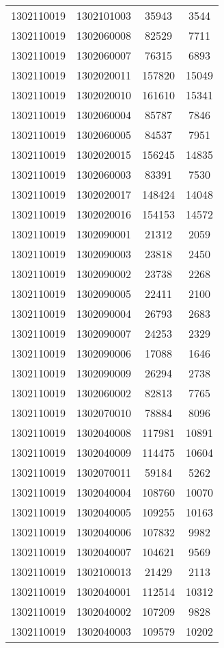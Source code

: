 \begin{longtable}[h]{llcc}
		1302110019 & 1302101003 & 35943 & 3544\\
		1302110019 & 1302060008 & 82529 & 7711\\
		1302110019 & 1302060007 & 76315 & 6893\\
		1302110019 & 1302020011 & 157820 & 15049\\
		1302110019 & 1302020010 & 161610 & 15341\\
		1302110019 & 1302060004 & 85787 & 7846\\
		1302110019 & 1302060005 & 84537 & 7951\\
		1302110019 & 1302020015 & 156245 & 14835\\
		1302110019 & 1302060003 & 83391 & 7530\\
		1302110019 & 1302020017 & 148424 & 14048\\
		1302110019 & 1302020016 & 154153 & 14572\\
		1302110019 & 1302090001 & 21312 & 2059\\
		1302110019 & 1302090003 & 23818 & 2450\\
		1302110019 & 1302090002 & 23738 & 2268\\
		1302110019 & 1302090005 & 22411 & 2100\\
		1302110019 & 1302090004 & 26793 & 2683\\
		1302110019 & 1302090007 & 24253 & 2329\\
		1302110019 & 1302090006 & 17088 & 1646\\
		1302110019 & 1302090009 & 26294 & 2738\\
		1302110019 & 1302060002 & 82813 & 7765\\
		1302110019 & 1302070010 & 78884 & 8096\\
		1302110019 & 1302040008 & 117981 & 10891\\
		1302110019 & 1302040009 & 114475 & 10604\\
		1302110019 & 1302070011 & 59184 & 5262\\
		1302110019 & 1302040004 & 108760 & 10070\\
		1302110019 & 1302040005 & 109255 & 10163\\
		1302110019 & 1302040006 & 107832 & 9982\\
		1302110019 & 1302040007 & 104621 & 9569\\
		1302110019 & 1302100013 & 21429 & 2113\\
		1302110019 & 1302040001 & 112514 & 10312\\
		1302110019 & 1302040002 & 107209 & 9828\\
		1302110019 & 1302040003 & 109579 & 10202\\

\end{longtable}
